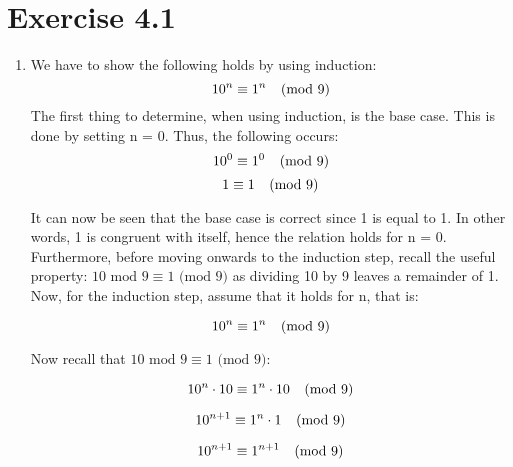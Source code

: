 \section{Exercise 4.1}
\renewcommand{\labelenumi}{\alph{enumi})}
\begin{enumerate}
\item
We have to show the following holds by using induction:
\[10^n \equiv 1^n \mbox{\hspace{0.25cm} (mod 9)}\]
The first thing to determine, when using induction, is the base case. This is done by setting n = 0. Thus, the following occurs:
\[10^0 \equiv 1^0 \mbox{\hspace{0.25cm} (mod 9)}\]
\vspace{-8mm}
\[1 \equiv 1 \mbox{\hspace{0.25cm} (mod 9)}\]

It can now be seen that the base case is correct since 1 is equal to 1. In other words, 1 is congruent with itself, hence the relation holds for n = 0. Furthermore, before moving onwards to the induction step, recall the useful property: $10 \text{ mod } 9 \equiv 1 \text{ (mod 9)}$ as dividing 10 by 9 leaves a remainder of 1. Now, for the induction step, assume that it holds for n, that is:

\vspace{-8mm}

\begin{equation}
    10^n \equiv 1^n \mbox{\hspace{0.25cm} (mod 9)}
\end{equation}

Now recall that $10 \text{ mod } 9 \equiv 1 \text{ (mod 9)}$:

\begin{equation}
    10^n \cdot 10 \equiv 1^n \cdot 10 \mbox{\hspace{0.25cm} (mod 9)}
\end{equation}

\vspace{-8mm}

\begin{equation}
    10^{n+1} \equiv 1^n \cdot 1 \mbox{\hspace{0.25cm} (mod 9)}
\end{equation}

\vspace{-8mm}

\begin{equation}
    10^{n+1} \equiv 1^{n+1} \mbox{\hspace{0.25cm} (mod 9)}
\end{equation}


\end{enumerate}
